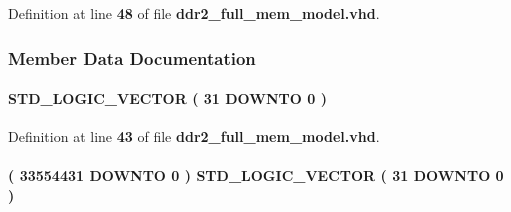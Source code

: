 Definition at line {\bf 48} of file {\bf ddr2\+\_\+full\+\_\+mem\+\_\+model.\+vhd}.



\subsubsection{Member Data Documentation}
\paragraph[{internal\+\_\+q}]{ {\bfseries \textcolor{comment}{S\+T\+D\+\_\+\+L\+O\+G\+I\+C\+\_\+\+V\+E\+C\+T\+OR}\textcolor{vhdlchar}{ }\textcolor{vhdlchar}{(}\textcolor{vhdlchar}{ }\textcolor{vhdlchar}{ } \textcolor{vhdldigit}{31} \textcolor{vhdlchar}{ }\textcolor{keywordflow}{D\+O\+W\+N\+TO}\textcolor{vhdlchar}{ }\textcolor{vhdlchar}{ } \textcolor{vhdldigit}{0} \textcolor{vhdlchar}{ }\textcolor{vhdlchar}{)}\textcolor{vhdlchar}{ }} \hspace{0.3cm}{\ttfamily [Signal]}}\label{classddr2__full__mem__model__ram__module_1_1europa_a360eb1a08c60081135b01d3ebb974fb2}


Definition at line {\bf 43} of file {\bf ddr2\+\_\+full\+\_\+mem\+\_\+model.\+vhd}.

\paragraph[{mem\+\_\+array}]{ {\bfseries \textcolor{vhdlchar}{(}\textcolor{vhdlchar}{ }\textcolor{vhdlchar}{ } \textcolor{vhdldigit}{33554431} \textcolor{vhdlchar}{ }\textcolor{keywordflow}{D\+O\+W\+N\+TO}\textcolor{vhdlchar}{ }\textcolor{vhdlchar}{ } \textcolor{vhdldigit}{0} \textcolor{vhdlchar}{ }\textcolor{vhdlchar}{)}\textcolor{vhdlchar}{ }\textcolor{vhdlchar}{ }\textcolor{comment}{S\+T\+D\+\_\+\+L\+O\+G\+I\+C\+\_\+\+V\+E\+C\+T\+OR}\textcolor{vhdlchar}{ }\textcolor{vhdlchar}{(}\textcolor{vhdlchar}{ }\textcolor{vhdlchar}{ } \textcolor{vhdldigit}{31} \textcolor{vhdlchar}{ }\textcolor{keywordflow}{D\+O\+W\+N\+TO}\textcolor{vhdlchar}{ }\textcolor{vhdlchar}{ } \textcolor{vhdldigit}{0} \textcolor{vhdlchar}{ }\textcolor{vhdlchar}{)}\textcolor{vhdlchar}{ }} \hspace{0.3cm}{\ttfamily [Type]}}\label{classddr2__full__mem__model__ram__module_1_1europa_a24098e3eb14617ff52ef440710b02e1a}


